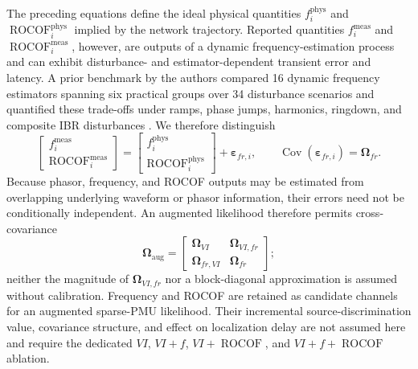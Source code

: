 \documentclass{ieeeaccess}
\begin{document}
The preceding equations define the ideal physical quantities $f_i^{\mathrm{phys}}$ and $\operatorname{ROCOF}_i^{\mathrm{phys}}$ implied by the network trajectory. Reported quantities $f_i^{\mathrm{meas}}$ and $\operatorname{ROCOF}_i^{\mathrm{meas}}$, however, are outputs of a dynamic frequency-estimation process and can exhibit disturbance- and estimator-dependent transient error and latency. A prior benchmark by the authors compared 16 dynamic frequency estimators spanning six practical groups over 34 disturbance scenarios and quantified these trade-offs under ramps, phase jumps, harmonics, ringdown, and composite IBR disturbances \cite{Mayorga2026FrequencyBenchmark}. We therefore distinguish
\begin{equation}
 \begin{bmatrix}f_i^{\mathrm{meas}}\\\operatorname{ROCOF}_i^{\mathrm{meas}}\end{bmatrix}
 =
 \begin{bmatrix}f_i^{\mathrm{phys}}\\\operatorname{ROCOF}_i^{\mathrm{phys}}\end{bmatrix}
 +\bm\varepsilon_{fr,i},\qquad
 \operatorname{Cov}(\bm\varepsilon_{fr,i})=\bm\Omega_{fr}.
\end{equation}
Because phasor, frequency, and ROCOF outputs may be estimated from overlapping underlying waveform or phasor information, their errors need not be conditionally independent. An augmented likelihood therefore permits cross-covariance
\begin{equation}
 \bm\Omega_{\mathrm{aug}}=
 \begin{bmatrix}
 \bm\Omega_{VI}&\bm\Omega_{VI,fr}\\
 \bm\Omega_{fr,VI}&\bm\Omega_{fr}
 \end{bmatrix};
\end{equation}
neither the magnitude of $\bm\Omega_{VI,fr}$ nor a block-diagonal approximation is assumed without calibration. Frequency and ROCOF are retained as candidate channels for an augmented sparse-PMU likelihood. Their incremental source-discrimination value, covariance structure, and effect on localization delay are not assumed here and require the dedicated $VI$, $VI+f$, $VI+\operatorname{ROCOF}$, and $VI+f+\operatorname{ROCOF}$ ablation.
\end{document}
